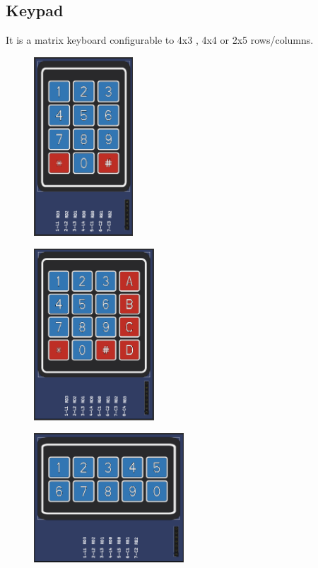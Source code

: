 \subsection{Keypad}

It is a matrix keyboard configurable to 4x3 , 4x4 or 2x5 rows/columns.

\begin{figure}[H]
\center
\includegraphics[width=0.33\textwidth]{img/part_keyb_4x3.png} 
\end{figure} 

\begin{figure}[H]
\center
\includegraphics[width=0.4\textwidth]{img/part_keyb_4x4.png} 
\end{figure} 

\begin{figure}[H]
\center
\includegraphics[width=0.5\textwidth]{img/part_keyb_2x5.png} 
\end{figure} 

